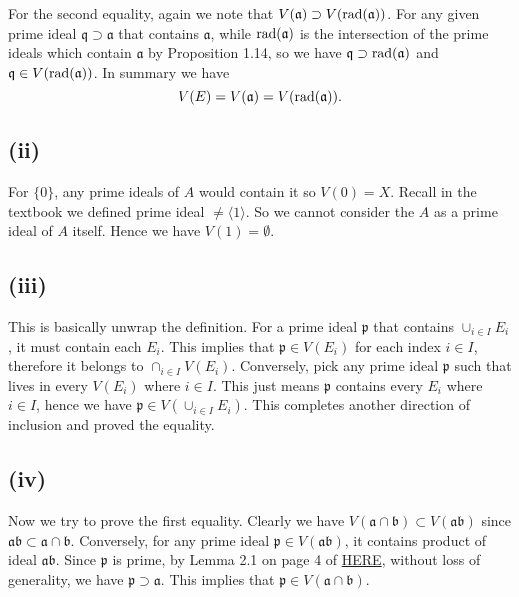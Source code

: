 \noindent For the second equality, again we note that $V(\mathfrak a)\supset V(\operatorname{rad}(\mathfrak a))$. For any given prime ideal $\mathfrak q\supset \mathfrak a$ that contains $\mathfrak a$, while $\operatorname{rad}(\mathfrak a)$ is the intersection of the prime ideals which contain $\mathfrak a$ by Proposition 1.14, so we have $\mathfrak q\supset \operatorname{rad}(\mathfrak a)$ and $\mathfrak q\in V(\operatorname{rad}(\mathfrak a))$. In summary we have 
$$V(E)=V(\mathfrak a)=V(\operatorname{rad}(\mathfrak a)).$$

\subsection{(ii)} For $\{0\}$, any prime ideals of $A$ would contain it so $V(0)=X$. Recall in the textbook we defined prime ideal $\neq \langle 1\rangle$. So we cannot consider the $A$ as a prime ideal of $A$ itself. Hence we have $V(1)=\emptyset$.\\

\subsection{(iii)} This is basically unwrap the definition. For a prime ideal $\mathfrak p$ that contains $\cup_{i\in I} E_i$, it must contain each $E_i$. This implies that $\mathfrak p\in V(E_i)$ for each index $i\in I$, therefore it belongs to $\cap _{i\in I} V(E_i)$. Conversely, pick any prime ideal $\mathfrak p$ such that lives in every $V(E_i)$ where $i\in I$. This just means $\mathfrak p$ contains every $E_i$ where $i\in I$, hence we have $\mathfrak p\in V(\cup_{i\in I} E_i)$. This completes another direction of inclusion and proved the equality.\\

\subsection{(iv)} Now we try to prove the first equality. Clearly we have $V(\mathfrak a \cap \mathfrak b)\subset V(\mathfrak a\mathfrak b)$ since $\mathfrak a\mathfrak b\subset \mathfrak a\cap \mathfrak b$. Conversely, for any prime ideal $\mathfrak p\in V(\mathfrak a\mathfrak b)$, it contains product of ideal $\mathfrak a\mathfrak b$. Since $\mathfrak p$ is prime, by Lemma 2.1 on page 4 of \href{https://www.jmilne.org/math/xnotes/CA.pdf}{HERE}, without loss of generality, we have $\mathfrak p\supset \mathfrak a$. This implies that $\mathfrak p\in V(\mathfrak a\cap\mathfrak b)$.\\

